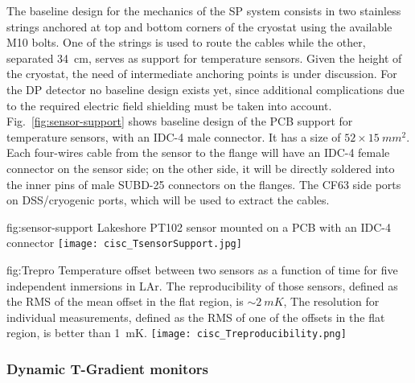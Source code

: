 The baseline design for the mechanics of the SP system consists in two stainless strings anchored at top and bottom corners of the cryostat
using the available M10 bolts. One of the strings is used to route the cables while the other, separated \SI{34}{cm}, serves as support for temperature sensors.
Given the height of the cryostat, the need of intermediate anchoring points is under discussion. For the DP detector no baseline design exists yet,
since additional complications due to the required electric field shielding must be taken into account. Fig.~\ref{fig:sensor-support} shows baseline design of the
PCB support for temperature sensors, with an IDC-4 male connector. It has a size of $52\times \SI{15}{mm^2}$. Each four-wires cable from the sensor to the flange will have an IDC-4 female connector
on the sensor side; on the other side, it will be directly soldered into the inner pins of male SUBD-25 connectors on the flanges. The CF63 side ports on DSS/cryogenic ports,
which will be used to extract the cables. 

\begin{dunefigure}{fig:sensor-support}
  {Lakeshore PT102 sensor mounted on a PCB with an IDC-4 connector}
  \texttt{[image: cisc\_TsensorSupport.jpg]}%
\end{dunefigure}


\begin{dunefigure}{fig:Trepro}
  {Temperature offset between two sensors as a function of time for five independent inmersions in LAr. The reproducibility of those sensors,
    defined as the RMS of the mean offset in the flat region, is $\sim \SI{2}{mK}$,
    The resolution for individual measurements, defined as the RMS of one of the offsets in the flat region, is better than \SI{1}{mK}.}
  \texttt{[image: cisc\_Treproducibility.png]}%
\end{dunefigure}


\subsubsection{Dynamic T-Gradient monitors}

